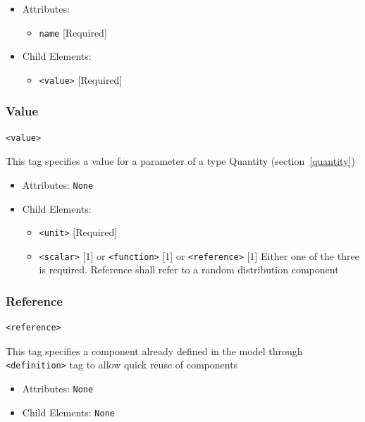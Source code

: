 \documentclass[draftspec]{ninemlspec}
\begin{document}
\begin{itemize}
\item Attributes:
%
\begin{itemize}
\item \verb|name| {[}Required{]}
\end{itemize}


\item Child Elements:
%
\begin{itemize}
\item \verb|<value>| {[}Required{]}
\end{itemize}

\end{itemize}

\subsubsection{Value}
%
\begin{lstlisting}
<value>
\end{lstlisting}

This tag specifies a value for a parameter of a type Quantity
(section~\ref{quantity})

\begin{itemize}
\item Attributes: \texttt{None}

\item Child Elements:
%
\begin{itemize}
\item \verb|<unit>| {[}Required{]}
\item \verb|<scalar>| {[}1{]} or \verb|<function>| {[}1{]} or
\verb|<reference>| {[}1{]} Either one of the three is required. Reference
shall refer to a random distribution component
\end{itemize}

\end{itemize}

\subsubsection{Reference}
%
\begin{lstlisting}
<reference>
\end{lstlisting}

This tag specifies a component already defined in the model through
\verb|<definition>| tag to allow quick reuse of components

\begin{itemize}
\item Attributes: \texttt{None}

\item Child Elements: \texttt{None}

\end{itemize}
\end{document}
